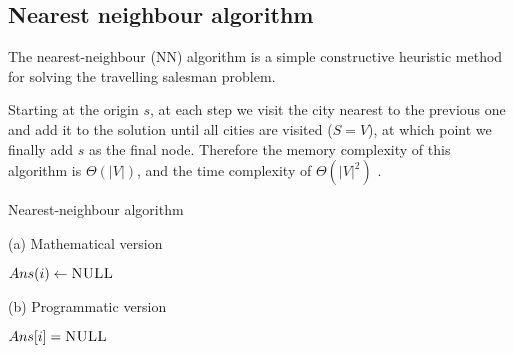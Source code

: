 \subsection{Nearest neighbour algorithm} \label{algorithm-tsp-nn}
The nearest-neighbour (NN) algorithm is a simple \gls{constructive} heuristic method for solving the travelling salesman problem.\par
Starting at the origin $s$, at each step we visit the city nearest to the previous one and add it to the solution until all cities are visited ($S = V$), at which point we finally add $s$ as the final node.
Therefore the memory complexity of this algorithm is $\Theta (|V|)$, and the time complexity of $\Theta (|V|^{2})$ \cite{reinelt}.
\begin{algorithm}[ht]
    \caption{Nearest-neighbour algorithm}
    \label{alg:nearest neighbour}
    \begin{minipage}[t]{0.49\linewidth}
        (a) Mathematical version
        \begin{algorithmic}[1]
                 {$Ans(i) \gets \textsc{NULL}$}
                \EndFor
                \EndFor
                \State {}
            \EndFunction
        \end{algorithmic}
    \end{minipage}
    \begin{minipage}[t]{0.49\linewidth}
        (b) Programmatic version
        \begin{algorithmic}[1]
                 {$Ans[i] = \textsc{NULL}$}
                \EndFor
                        \EndIf
                    \EndFor
                \EndFor
                \State {}
            \EndFunction
        \end{algorithmic}
    \end{minipage}
\end{algorithm}

